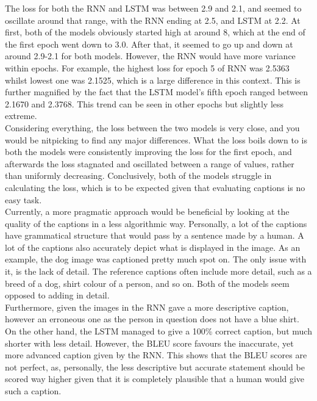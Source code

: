 \documentclass{article}
\begin{document}
    The loss for both the RNN and LSTM was between 2.9 and 2.1, and seemed to oscillate around that range, with the RNN ending at 2.5, and LSTM at 2.2. At first, both of the models obviously started high at around 8, which at the end of the first epoch went down to 3.0. After that, it seemed to go up and down at around 2.9-2.1 for both models. However, the RNN would have more variance within epochs. For example, the highest loss for epoch 5 of RNN was 2.5363 whilst lowest one was 2.1525, which is a large difference in this context. This is further magnified by the fact that the LSTM model's fifth epoch ranged between 2.1670 and 2.3768. This trend can be seen in other epochs but slightly less extreme.\\

    Considering everything, the loss between the two models is very close, and you would be nitpicking to find any major differences. What the loss boils down to is both the models were consistently improving the loss for the first epoch, and afterwards the loss stagnated and oscillated between a range of values, rather than uniformly decreasing. Conclusively, both of the models struggle in calculating the loss, which is to be expected given that evaluating captions is no easy task.\\
    
    Currently, a more pragmatic approach would be beneficial by looking at the quality of the captions in a less algorithmic way. Personally, a lot of the captions have grammatical structure that would pass by a sentence made by a human. A lot of the captions also accurately depict what is displayed in the image. As an example, the dog image was captioned pretty much spot on. The only issue with it, is the lack of detail. The reference captions often include more detail, such as a breed of a dog, shirt colour of a person, and so on. Both of the models seem opposed to adding in detail. \\ 
    
    Furthermore, given the images in the RNN gave a more descriptive caption, however an erroneous one as the person in question does not have a blue shirt. On the other hand, the LSTM managed to give a 100\% correct caption, but much shorter with less detail. However, the BLEU score favours the inaccurate, yet more advanced caption given by the RNN. This shows that the BLEU scores are not perfect, as, personally, the less descriptive but accurate statement should be scored way higher given that it is completely plausible that a human would give such a caption.\\
\end{document}
